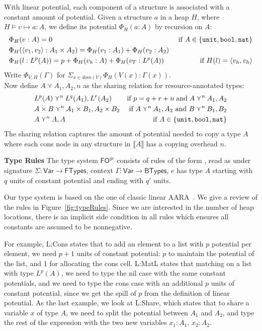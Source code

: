 \documentclass{easychair}
\newcommand{\ms}[1]{\ensuremath{\mathsf{#1}}}
\newcommand{\irl}[1]{\mathtt{#1}}
\newcounter{rule}
\newcommand{\fogc}{\ms{FO}^{gc}}
\theoremstyle{definition}
\begin{document}
With linear potential, each component of a structure is associated with a constant amount of 
potential.  Given a structure $a$ in a heap $H$, where  $H \vDash v \mapsto a : A$, we define 
its potential $\Phi_H(a : A)$ by recursion on $A$: 
%
\begin{align*}
	&\Phi_H(v : A) = 0 &\text{ if } A \in \{\unittycst, \booltyabt, \irl{nat}\}\\
&\Phi_H(\pairexcst{v_1}{v_2} : \prodtycst{A_1}{A_2}) = \Phi_H(v_1 : A_1) + \Phi_H(v_2 : A_2)\\
	&\Phi_H(l : L^p(A)) = p + \Phi_H(v_h : A) + \Phi_H(v_T : L^p(A)) &\text{ if } 
		H(l) = \pairexcst{v_h}{v_h}
\end{align*}
%
Write $\Phi_{V,H}(\Gamma)$ for $\Sigma_{x \in dom(V)} \Phi_H(V(x) : \Gamma(x))$.\\
Now define $A \curlyvee A_1,A_2,n$ as the sharing relation for resource-annotated types:
\begin{align*}
	&L^p(A) \curlyvee^n L^q(A_1),L^r(A_2) & \text{if } p = q + r + n \;\text{and}\; 
			A \curlyvee^n A_1,A_2\\
	&\prodtycst{A}{B} \curlyvee^n \prodtycst{A_1}{B_1}, \prodtycst{A_2}{B_2}
		&\text{ if } A \curlyvee^n A_1,A_2 \text{ and } B \curlyvee^n B_1,B_2\\
	&A \curlyvee^n  A,A& \text{ if } A \in \{\unittycst, \booltycst, \irl{nat}\}
\end{align*}
The sharing relation captures the amount of potential needed to copy a type $A$ where each 
cons node in any structure in $\llbracket A \rrbracket$ has a copying overhead $n$.

\textbf{Type Rules}
\label{sect:typing}
The type system $\fogc$ consists of rules of the form , 
read as under signature $\Sigma : \ms{Var} \to \ms{FTypes}$, 
context $\Gamma : \ms{Var} \to \ms{BTypes}$, $e$ has type $A$ starting with $q$ units of 
constant potential and ending with $q'$ units.

Our type system is based on the one of classic linear AARA~\cite{Jost03}. 
We give a review of the rules in Figure~\ref{fig:typeRules}.
Since we are interested in the number of heap locations, 
there is an implicit side condition in all rules
which ensures all constants are assumed to be nonnegative.
	
For example, L:Cons states that to add an element to a list with $p$ potential per element, 
we need $p+1$ units of constant potential: $p$ to maintain the potential of the list,
and 1 for allocating the cons cell. L:MatL states that matching on a list with type $L^p(A)$,
we need to type the nil case with the same constant potentials, and we need to type
the cons case with an additional $p$ units of constant potential, since we get 
the spill of $p$ from the definition of linear potential. 
As the last example, we look at L:Share, which states that to share 
a variable $x$ of type $A$, we need to split the potential between $A_1$ and $A_2$, and type the 
rest of the expression with the two new variables $x_1: A_1$, $x_2 : A_2$.
\end{document}
